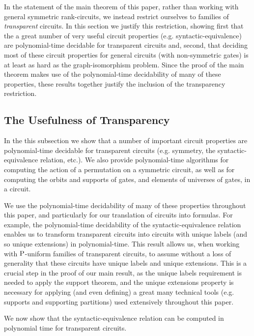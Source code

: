 \documentclass[../paper.tex]{subfiles}
\begin{document}
In the statement of the main theorem of this paper, rather than working with
general symmetric rank-circuits, we instead restrict ourselves to families of
\emph{transparent} circuits. In this section we justify this restriction,
showing first that the a great number of very useful circuit properties (e.g.
syntactic-equivalence) are polynomial-time decidable for transparent circuits
and, second, that deciding most of these circuit properties for general circuits
(with non-symmetric gates) is at least as hard as the graph-isomorphism
problem. Since the proof of the main theorem makes use of the polynomial-time
decidability of many of these properties, these results together justify the
inclusion of the transparency restriction.

\subsection{The Usefulness of Transparency}
In the this subsection we show that a number of important circuit properties are
polynomial-time decidable for transparent circuits (e.g. symmetry, the
syntactic-equivalence relation, etc.). We also provide polynomial-time
algorithms for computing the action of a permutation on a symmetric circuit, as
well as for computing the orbits and supports of gates, and elements of
universes of gates, in a circuit.

We use the polynomial-time decidability of many of these properties throughout
this paper, and particularly for our translation of circuits into formulas. For
example, the polynomial-time decidability of the syntactic-equivalence relation
enables us to transform transparent circuits into circuits with unique labels
(and so unique extensions) in polynomial-time. This result allows us, when
working with $\mathrm{P}$-uniform families of transparent circuits, to assume without a
loss of generality that these circuits have unique labels and unique extensions.
This is a crucial step in the proof of our main result, as the unique labels
requirement is needed to apply the support theorem, and the unique extensions
property is necessary for applying (and even defining) a great many technical
tools (e.g. supports and supporting partitions) used extensively throughout this
paper.

We now show that the syntactic-equivalence relation can be computed in
polynomial time for transparent circuits.
\end{document}
